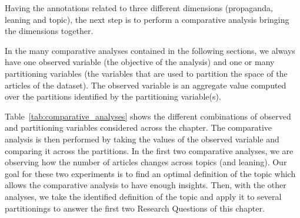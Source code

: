 Having the annotations related to three different dimensions (propaganda, leaning and topic), the next step is to perform a comparative analysis bringing the dimensions together.

In the many comparative analyses contained in the following sections, we always have one observed variable (the objective of the analysis) and one or many partitioning variables (the variables that are used to partition the space of the articles of the dataset). The observed variable is an aggregate value computed over the partitions identified by the partitioning variable(s).

\begin{table}[!htbp]
    \centering
    \caption{The comparative analyses of this chapter}
    \label{tab:comparative_analyses}
\end{table}

Table~\ref{tab:comparative_analyses} shows the different combinations of observed and partitioning variables considered across the chapter.
The comparative analysis is then performed by taking the values of the observed variable and comparing it across the partitions.
In the first two comparative analyses, we are observing how the number of articles changes across topics (and leaning). Our goal for these two experiments is to find an optimal definition of the topic which allows the comparative analysis to have enough insights.
Then, with the other analyses, we take the identified definition of the topic and apply it to several partitionings to answer the first two Research Questions of this chapter.



